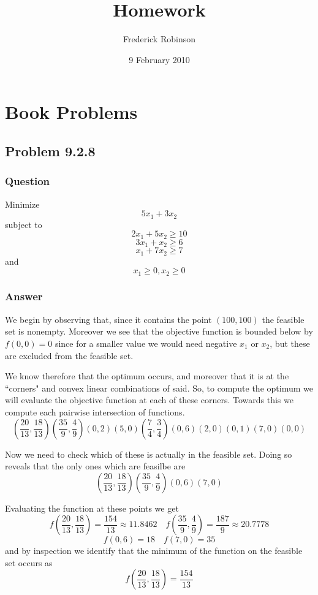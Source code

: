 \documentclass[12pt]{article}
\title{Homework}
\author{Frederick Robinson}
\date{9 February 2010}
\begin{document}

   \maketitle

\setcounter{tocdepth}{2} 

\tableofcontents

\section{Book Problems}

\subsection{Problem 9.2.8}
\subsubsection{Question}
Minimize 
\[ 5 x_1 + 3 x_2\]
subject to 
\[2x_1+5x_2 \geq 10\]
\[3x_1+x_2 \geq 6 \]
\[x_1+7 x_2 \geq 7\]
and 
\[x_1 \geq 0, x_2 \geq 0\]
\subsubsection{Answer}
We begin by observing that, since it contains the point $(100,100)$  the feasible set is nonempty. Moreover we see that the objective function is bounded below by $f(0,0)=0$ since for a smaller value we would need negative $x_1$ or $x_2$, but these are excluded from the feasible set.

We know therefore that the optimum occurs, and moreover that it is at the ``corners" and convex linear combinations of said. So, to compute the optimum we will evaluate the objective function at each of these corners. Towards this we compute each pairwise intersection of functions.
\[
\left(\frac{20}{13},\frac{18}{13}\right)
\left(\frac{35}{9},\frac{4}{9}\right)
(0,2)
(5,0)
\left(\frac{7}{4},\frac{3}{4}\right)
(0,6)
(2,0)
(0,1)
(7,0)
(0,0)
\]

Now we need to check which of these is actually in the feasible set. Doing so reveals that the only ones which are feasilbe are 
\[
\left(\frac{20}{13},\frac{18}{13}\right)
\left(\frac{35}{9},\frac{4}{9}\right)
(0,6)
(7,0)
\]

Evaluating the function at these points we get
\[
f\left(\frac{20}{13},\frac{18}{13}\right)=\frac{154}{13}\approx 11.8462\quad
f\left(\frac{35}{9},\frac{4}{9}\right)=\frac{187}{9}\approx 20.7778
\]
\[
f(0,6)=18\quad
f(7,0)=35
\]
and by inspection we identify that the minimum of the function on the feasible set occurs as
\[f\left(\frac{20}{13},\frac{18}{13}\right)=\frac{154}{13}\]
\end{document}
